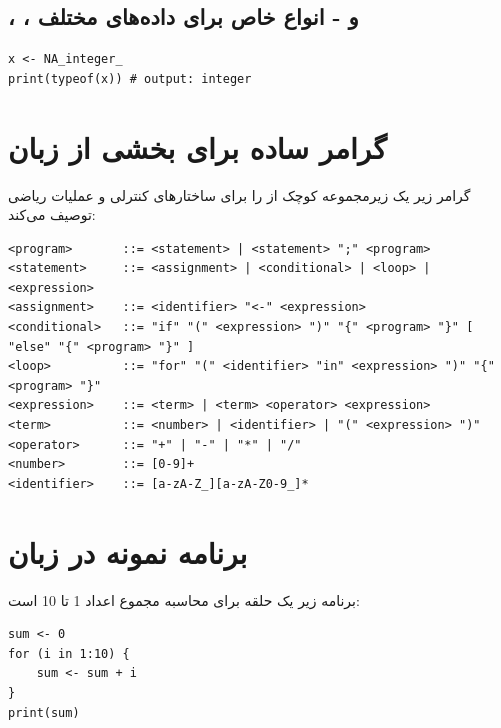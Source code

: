 \documentclass[11pt, a4paper, oneside]{book}
\begin{document}
			\subsection{، ،  و  - انواع خاص  برای داده‌های مختلف}
				\begin{latin}
					\begin{lstlisting}[caption={\lr{NA\_integer\_, NA\_real\_, NA\_complex\_, NA\_character\_}}]
x <- NA_integer_
print(typeof(x)) # output: integer
					\end{lstlisting}
				\end{latin}
				
				
				
		\section{گرامر ساده برای بخشی از زبان}
			
			گرامر زیر یک زیرمجموعه کوچک از  را برای ساختارهای کنترلی و عملیات ریاضی توصیف می‌کند:
			
		
			\begin{latin}
				\begin{lstlisting}[caption={\lr{Simple R grammar}}]
<program>       ::= <statement> | <statement> ";" <program>
<statement>     ::= <assignment> | <conditional> | <loop> | <expression>
<assignment>    ::= <identifier> "<-" <expression>
<conditional>   ::= "if" "(" <expression> ")" "{" <program> "}" [ "else" "{" <program> "}" ]
<loop>          ::= "for" "(" <identifier> "in" <expression> ")" "{" <program> "}" 
<expression>    ::= <term> | <term> <operator> <expression>
<term>          ::= <number> | <identifier> | "(" <expression> ")"
<operator>      ::= "+" | "-" | "*" | "/"
<number>        ::= [0-9]+
<identifier>    ::= [a-zA-Z_][a-zA-Z0-9_]*

				\end{lstlisting}
			\end{latin}
				
				
			\section{برنامه نمونه در زبان}  \label{Simple_R_program}
			
				برنامه زیر یک حلقه برای محاسبه مجموع اعداد 1 تا 10 است:
				
				\begin{latin}
					\begin{lstlisting}[caption={\lr{Simple R program}}] 
sum <- 0
for (i in 1:10) {
	sum <- sum + i
}
print(sum)
						
					\end{lstlisting}
				\end{latin}
				
\end{document}
